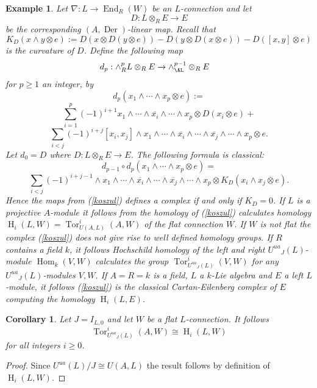 \documentclass{amsart}
\theoremstyle{plain}
\newtheorem{corollary}[theorem]{Corollary}
\newtheorem{example}[theorem]{Example}
\theoremstyle{definition}
\theoremstyle{remark}
\numberwithin{equation}{theorem}
\begin{document}
\begin{example} 

Let $\nabla:L\rightarrow {\operatorname{End} }_{R}(W)$ be an $L$-connection and let
\[ D:L\otimes_{R} E \rightarrow E \]
be the corresponding $({A},{\operatorname{Der} })$-linear map.
Recall that
\[ K_D(x\wedge y\otimes e):=D(x\otimes D(y\otimes e))-D(y\otimes D(x\otimes e))-D([x,y]\otimes e)\]
is the curvature of $D$.
Define the following map
\begin{align}
&\label{koszul} d_p:\wedge_{R}^{p} L\otimes_{R} E\rightarrow \wedge^{p-1}_\AL\otimes_{R} E 
\end{align}
for $p\geq 1$ an integer, by
\[ d_p(x_1\wedge \cdots \wedge x_p\otimes e):=\]
\[\sum_{i=1}^p(-1)^{i+1}x_1\wedge \cdots \wedge\overline{x_i}\wedge \cdots \wedge x_p\otimes D(x_i\otimes e)+\]
\[\sum_{i<j}(-1)^{i+j}[x_i,x_j]\wedge x_1\wedge \cdots \wedge \overline{x_i}\wedge \cdots \wedge
\overline{x_j}\wedge \cdots \wedge x_p\otimes e.\]
Let $d_0=D$ where $D:L\otimes_{R} E\rightarrow E$.
The following formula is classical:
\[ d_{p-1}\circ d_p(x_1\wedge \cdots \wedge x_p\otimes e)=\]
\[ \sum_{i<j}(-1)^{i+j-1}\wedge x_1\wedge \cdots \wedge \overline{x_i}\wedge \cdots \wedge
\overline{x_j}\wedge \cdots \wedge x_p\otimes K_D(x_i\wedge x_j\otimes e).\]
Hence the maps from (\ref{koszul}) defines a complex if and only if $K_D=0$. If $L$ is a projective ${A}$-module it follows
from \cite{rinehart} the homology of (\ref{koszul}) calculates homology ${\operatorname{H} }_i(L,W)={\operatorname{Tor} }_{U({A},L)}^i({A},W)$ 
of the flat connection $W$. If $W$ is not flat the complex (\ref{koszul}) does not give rise to well defined homology groups. 
If ${R}$ contains a field $k$, it follows Hochschild homology of the left and right ${U^{ua}}_J(L)$-module ${\operatorname{Hom} }_k(V,W)$ calculates
the group ${\operatorname{Tor} }^i_{{U^{ua}}_J(L)}(V,W)$ for any ${U^{ua}}_J(L)$-modules $V,W$.
If ${A}={R}=k$ is a field, $L$ a $k$-Lie algebra and $E$ a left $L$-module, it follows 
(\ref{koszul}) is the classical Cartan-Eilenberg complex of $E$ computing the homology ${\operatorname{H} }_i(L,E)$.
\end{example}

\begin{corollary} Let $J=I_{L,0}$ and let $W$ be a flat $L$-connection. It follows
\[ {\operatorname{Tor} }^i_{{U^{ua}}_J(L)}({A},W)\cong {\operatorname{H} }_i(L,W) \]
for all integers $i\geq 0$.
\end{corollary}
\begin{proof} Since ${U^{ua}}(L)/J\cong U({A},L)$ the result follows by definition of ${\operatorname{H} }_i(L,W)$.
\end{proof}
\end{document}
